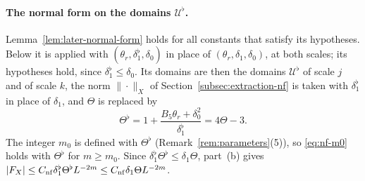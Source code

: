 \paragraph{The normal form on the domains $\mathcal U^\flat$.} Lemma~\ref{lem:later-normal-form} holds for all constants that satisfy its hypotheses. Below it is applied with $(\theta_r,\delta_1^\flat,\delta_0)$ in place of $(\theta_r,\delta_1,\delta_0)$, at both scales; its hypotheses hold, since $\delta_1^\flat\le\delta_0$. Its domains are then the domains $\mathcal U^\flat$ of scale $j$ and of scale $k$, the norm $\|\cdot\|_X$ of Section~\ref{subsec:extraction-nf} is taken with $\delta_1^\flat$ in place of $\delta_1$, and $\Theta$ is replaced by
\[
\Theta^\flat=1+\frac{B_5\theta_r+\delta_0^2}{\delta_1^\flat}=4\Theta-3 .
\]
The integer $m_0$ is defined with $\Theta^\flat$ (Remark~\ref{rem:parameters}(5)), so \eqref{eq:nf-m0} holds with $\Theta^\flat$ for $m\ge m_0$. Since $\delta_1^\flat\Theta^\flat\le\delta_1\Theta$, part~(b) gives $|F_X|\le C_{\rm nf}\delta_1^\flat\Theta^\flat L^{-2m}\le C_{\rm nf}\delta_1\Theta L^{-2m}$.

